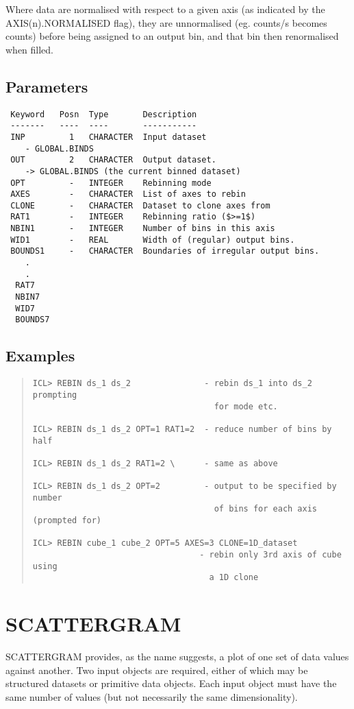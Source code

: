 \documentclass{book}
\renewcommand{\_}{{\tt\char'137}}     %
\begin{document}
Where data are normalised with respect to a given axis (as
indicated by the AXIS(n).NORMALISED flag), they are unnormalised
(eg. counts/s becomes counts) before being assigned to an output bin,
and that bin then renormalised when filled.

\subsection{Parameters}
\begin{verbatim}
 Keyword   Posn  Type       Description
 -------   ----  ----       -----------
 INP         1   CHARACTER  Input dataset
    - GLOBAL.BINDS
 OUT         2   CHARACTER  Output dataset.
    -> GLOBAL.BINDS (the current binned dataset)
 OPT         -   INTEGER    Rebinning mode
 AXES        -   CHARACTER  List of axes to rebin
 CLONE       -   CHARACTER  Dataset to clone axes from
 RAT1        -   INTEGER    Rebinning ratio ($>=1$)
 NBIN1       -   INTEGER    Number of bins in this axis
 WID1        -   REAL       Width of (regular) output bins.
 BOUNDS1     -   CHARACTER  Boundaries of irregular output bins.
    .
    .
  RAT7
  NBIN7
  WID7
  BOUNDS7

\end{verbatim}\subsection{Examples}
\begin{quote}\begin{verbatim}
ICL> REBIN ds_1 ds_2               - rebin ds_1 into ds_2 prompting
                                     for mode etc.

ICL> REBIN ds_1 ds_2 OPT=1 RAT1=2  - reduce number of bins by half

ICL> REBIN ds_1 ds_2 RAT1=2 \      - same as above

ICL> REBIN ds_1 ds_2 OPT=2         - output to be specified by number
                                     of bins for each axis (prompted for)

ICL> REBIN cube_1 cube_2 OPT=5 AXES=3 CLONE=1D_dataset
                                  - rebin only 3rd axis of cube using
                                    a 1D clone
\end{verbatim}\end{quote}
\section{SCATTERGRAM}
SCATTERGRAM provides, as the name suggests, a plot of one
set of data values against another. Two input objects are
required, either of which may be structured datasets or
primitive data objects. Each input object must have the
same number of values (but not necessarily the same
dimensionality).
\end{document}
